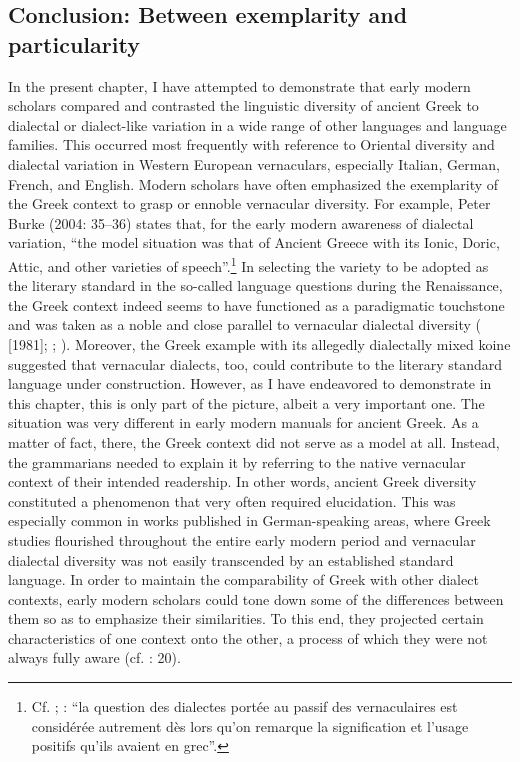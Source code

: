 \subsection{Conclusion: Between exemplarity and particularity}
\hypertarget{Toc19704868}{}
In the present chapter, I have attempted to demonstrate that early modern scholars compared and contrasted the linguistic diversity of ancient Greek to dialectal or dialect-like variation in a wide range of other languages and language families. This occurred most frequently with reference to Oriental diversity and dialectal variation in Western European vernaculars, especially Italian, German, French, and English. Modern scholars have often emphasized the exemplarity of the Greek context to grasp or ennoble vernacular diversity. For example, Peter Burke (2004: 35–36) states that, for the early modern awareness of dialectal variation, “the model situation was that of Ancient Greece with its Ionic, Doric, Attic, and other varieties of speech”.\footnote{Cf. \citet[923]{Haugen1966}; \citet[216]{Giard1992}: “la question des dialectes portée au passif des vernaculaires est considérée autrement dès lors qu’on remarque la signification et l’usage positifs qu’ils avaient en grec”.} In selecting the variety to be adopted as the literary standard in the so-called language questions during the Renaissance, the Greek context indeed seems to have functioned as a paradigmatic touchstone and was taken as a noble and close parallel to vernacular dialectal diversity (\citealt{Alinei1984} [1981]; \citealt{Trovato1984}; \citealt{Trapp1990}). Moreover, the Greek example with its allegedly dialectally mixed koine suggested that vernacular dialects, too, could contribute to the literary standard language under construction. However, as I have endeavored to demonstrate in this chapter, this is only part of the picture, albeit a very important one. The situation was very different in early modern manuals for ancient Greek. As a matter of fact, there, the Greek context did not serve as a model at all. Instead, the grammarians needed to explain it by referring to the native vernacular context of their intended readership. In other words, ancient Greek diversity constituted a phenomenon that very often required elucidation. This was especially common in works published in German-speaking areas, where Greek studies flourished throughout the entire early modern period and vernacular dialectal diversity was not easily transcended by an established standard language. In order to maintain the comparability of Greek with other dialect contexts, early modern scholars could tone down some of the differences between them so as to emphasize their similarities. To this end, they projected certain characteristics of one context onto the other, a process of which they were not always fully aware (cf. \citealt{Alinei1980}: 20).

